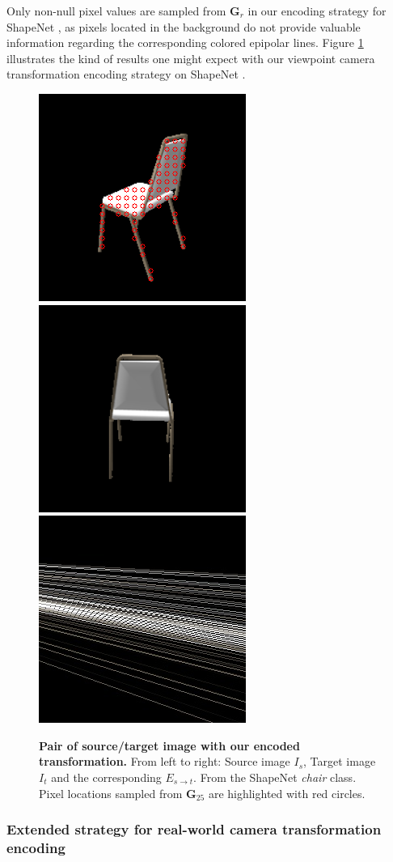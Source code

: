 Only non-null pixel values are sampled from $\textbf{G}_{r}$ in our encoding strategy for ShapeNet \citep{chang2015shapenet}, as pixels located in the background do not provide valuable information regarding the corresponding colored epipolar lines. Figure \ref{fig:examplePoseEncoded} illustrates the kind of results one might expect with our viewpoint camera transformation encoding strategy on ShapeNet \citep{chang2015shapenet}. 
\begin{figure}[h!]

\begin{center}
\includegraphics[width=.26\textwidth]{images/epipolarnvs/Is_ECML.png}\hspace{.5cm}%
\includegraphics[width=.26\textwidth]{images/epipolarnvs/It_ECML.png}\hspace{.5cm}%
\includegraphics[width=.26\textwidth]{images/epipolarnvs/Est_ECML.jpg}
\end{center}
\caption{\textbf{Pair of source/target image with our encoded transformation.} From left to right: Source image $I_s$, Target image $I_t$ and the corresponding $E_{s\xrightarrow{}t}$. From the ShapeNet \citep{chang2015shapenet} \textit{chair} class. Pixel locations sampled from $\textbf{G}_{25}$ are highlighted with red circles.}
\label{fig:examplePoseEncoded}
\end{figure}


\subsubsection{Extended strategy for real-world camera transformation encoding}

